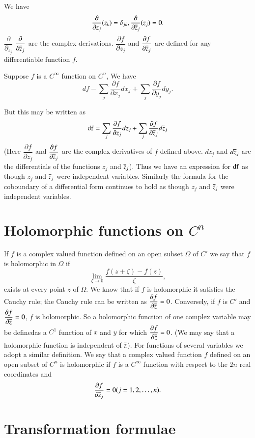 We have
$$
\frac{\partial}{\partial z_{j}}(z_{k})=\delta_{jk},
\frac{\partial}{\partial\overline{z}_{j}}(z_{j})=0.
$$
$\dfrac{\partial}{\partial_{z_{j}}}$\pageoriginale
$\dfrac{\partial}{\partial \overline{z}_{j}}$ are the complex
derivations. $\dfrac{\partial f}{\partial z_{j}}$ and $\dfrac{\partial
  f}{\partial \overline{z}_{j}}$ are defined for any differentiable function
$f$.

Suppose $f$ is a $C^{\infty}$ function on $C^{n}$, We have
$$
df-\sum_{j}\frac{\partial f}{\partial
  x_{j}}dx_{j}+\sum_{j}\frac{\partial f}{\partial y_{j}}dy_{j}.
$$

But this may be written as
$$
\operatorname{df}=\sum_{j}\frac{\partial f}{\partial
  z_{j}}dz_{j}+\sum_{j}\frac{\partial f}{\partial
  \overline{z}_{j}}d\overline{z}_{j}
$$
(Here $\dfrac{\partial f}{\partial z_{j}}$ and $\dfrac{\partial
  f}{\partial \overline{z}_{j}}$ are the complex derivatives of $f$ defined
above. $dz_{j}$ and $d\overline{z}_{j}$ are the differentials of the
functions $z_{j}$ and $\overline{z}_{j}$). Thus we have an expression for
$\operatorname{df}$ as though $z_{j}$ and $\overline{z}_{j}$ were independent
variables. Similarly the formula for the coboundary of a differential
form continues to hold as though $z_{j}$ and $\overline{z}_{j}$ were
independent variables.

\section*{Holomorphic functions on $C^{n}$}

If $f$ is a complex valued function defined on an open subset $\Omega$
of $C'$ we say that $f$ is holomorphic in $\Omega$ if
$$
\lim\limits_{\zeta\to 0}\frac{f(z+\zeta)-f(z)}{\zeta},
$$
exists at every point $z$ of $\Omega$. We know that if $f$ is
holomorphic it satisfies the Cauchy rule; the Cauchy rule can be
written as $\dfrac{\partial f}{\partial \overline{z}}=0$. Conversely, if $f$
is $C'$ and $\dfrac{\partial f}{\partial \overline{z}}=0$, $f$ is
holomorphic. So a holomorphic function of one complex variable may be
defined\pageoriginale as a $C^{1}$ function of $x$ and $y$ for which
$\dfrac{\partial f}{\partial \overline{z}}=0$. (We may say that a
holomorphic function is independent of $\overline{z}$). For functions of
several variables we adopt a similar definition. We say that a complex
valued function $f$ defined on an open subset of $C^{n}$ is
holomorphic if $f$ is a $C^{\infty}$ function with respect to the $2n$
real coordinates and
$$
\frac{\partial f}{\partial \overline{z}_{j}}=0(j=1,2,\ldots,n).
$$

\section*{Transformation formulae}

